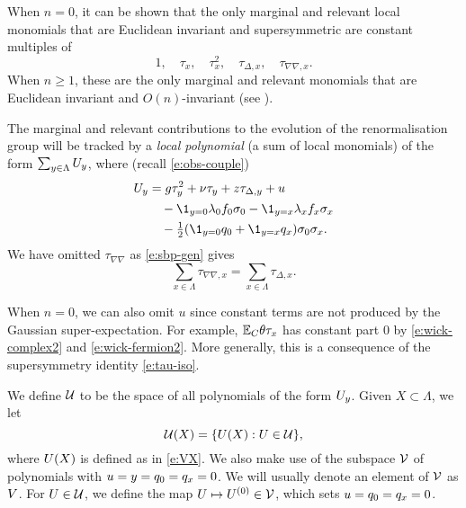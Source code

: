 When $n = 0$, it can be shown that the only marginal and relevant local monomials
that are Euclidean invariant and supersymmetric are constant multiples of
\begin{equation}
1, \quad \tau_x, \quad \tau_x^2, \quad \tau_{\Delta,x}, \quad \tau_{\nabla\nabla,x}.
\end{equation}
When $n \ge 1$, these are the only marginal and relevant monomials that are Euclidean
invariant and $O(n)$-invariant (see \cite{BBS-rg-pt}).

The marginal and relevant contributions to the evolution of the renormalisation group
will be tracked by a \emph{local polynomial} (a sum of local monomials) of the form
$\sum_{y\in\Lambda} U_y$, where (recall \eqref{e:obs-couple})
\begin{align}
\lbeq{Vy}
\Vc_y
	&=
g \tau_y^2 + \nu \tau_y + z \tau_{\Delta,y}
	+ u
		\nnb&\quad
	- \1_{y=\pp}\lambda_{\pp} f_0 \sigma_0
	- \1_{y=\qq}\lambda_{\qq} f_x \sigma_x
		\nnb&\quad
	- \textstyle{\frac 12} (\1_{y=\pp} q_\pp + \1_{y=\qq}q_\qq )\sigma_\pp\sigma_\qq.
\end{align}
We have omitted $\tau_{\nabla\nabla}$ as \eqref{e:sbp-gen} gives
\begin{equation}
\label{e:nabla-delta}
\sum_{x\in\Lambda} \tau_{\nabla\nabla,x} = \sum_{x\in\Lambda} \tau_{\Delta,x}.
\end{equation}

\begin{rk}
\label{rk:noconst}
When $n = 0$, we can also omit $u$ since constant terms are not produced by the 
Gaussian super-expectation. For example, $\mathbb{E}_C\theta \tau_x$ has constant part
$0$ by \eqref{e:wick-complex2} and \eqref{e:wick-fermion2}. More generally,
this is a consequence of the supersymmetry identity \eqref{e:tau-iso}.
\end{rk}

We define $\mathcal{U}$ to be the space of all polynomials of the form $U_y$.
Given $X \subset \Lambda$, we let
\begin{equation}
\label{e:Vcalesig}
\mathcal{U}(X) = \{U(X) : U \in \mathcal{U} \},
\end{equation}
where $U(X)$ is defined as in \eqref{e:VX}.
We also make use of the %
subspace $\mathcal{V}$ of polynomials with
$u = y = q_0=q_x = 0$.
We will usually denote an element of $\mathcal{V}$ as $V$.
For $U \in \mathcal{U}$, we define %
the map $U \mapsto U^{(0)} \in \mathcal{V}$, which sets
$u = q_0 = q_x = 0$.

